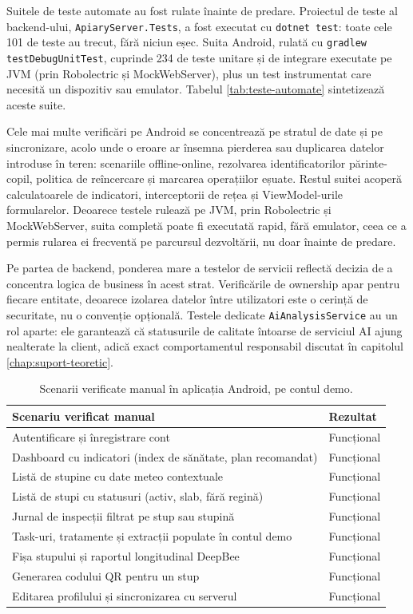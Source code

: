 Suitele de teste automate au fost rulate înainte de predare. Proiectul de teste al backend-ului, \texttt{ApiaryServer.Tests}, a fost executat cu \texttt{dotnet test}: toate cele 101 de teste au trecut, fără niciun eșec. Suita Android, rulată cu \texttt{gradlew testDebugUnitTest}, cuprinde 234 de teste unitare și de integrare executate pe JVM (prin Robolectric și MockWebServer), plus un test instrumentat care necesită un dispozitiv sau emulator. Tabelul \ref{tab:teste-automate} sintetizează aceste suite.

Cele mai multe verificări pe Android se concentrează pe stratul de date și pe sincronizare, acolo unde o eroare ar însemna pierderea sau duplicarea datelor introduse în teren: scenariile offline-online, rezolvarea identificatorilor părinte-copil, politica de reîncercare și marcarea operațiilor eșuate. Restul suitei acoperă calculatoarele de indicatori, interceptorii de rețea și ViewModel-urile formularelor. Deoarece testele rulează pe JVM, prin Robolectric și MockWebServer, suita completă poate fi executată rapid, fără emulator, ceea ce a permis rularea ei frecventă pe parcursul dezvoltării, nu doar înainte de predare.

Pe partea de backend, ponderea mare a testelor de servicii reflectă decizia de a concentra logica de business în acest strat. Verificările de ownership apar pentru fiecare entitate, deoarece izolarea datelor între utilizatori este o cerință de securitate, nu o convenție opțională. Testele dedicate \texttt{AiAnalysisService} au un rol aparte: ele garantează că statusurile de calitate întoarse de serviciul AI ajung nealterate la client, adică exact comportamentul responsabil discutat în capitolul \ref{chap:suport-teoretic}.

\begin{table}[H]
	\centering
	\begin{tabular}{l l}
		\hline
		\textbf{Scenariu verificat manual} & \textbf{Rezultat} \\
		\hline
		Autentificare și înregistrare cont & Funcțional \\
		Dashboard cu indicatori (index de sănătate, plan recomandat) & Funcțional \\
		Listă de stupine cu date meteo contextuale & Funcțional \\
		Listă de stupi cu statusuri (activ, slab, fără regină) & Funcțional \\
		Jurnal de inspecții filtrat pe stup sau stupină & Funcțional \\
		Task-uri, tratamente și extracții populate în contul demo & Funcțional \\
		Fișa stupului și raportul longitudinal DeepBee & Funcțional \\
		Generarea codului QR pentru un stup & Funcțional \\
		Editarea profilului și sincronizarea cu serverul & Funcțional \\
		\hline
	\end{tabular}
	\caption{Scenarii verificate manual în aplicația Android, pe contul demo.}
	\label{tab:teste-manuale}
\end{table}

